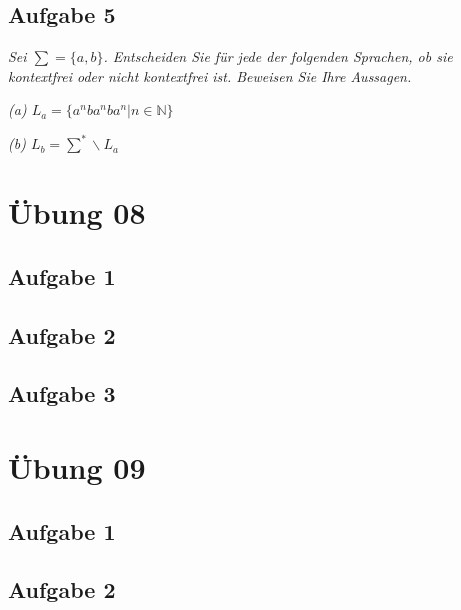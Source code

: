 \documentclass[a4paper]{article}
\begin{document}
\subsection{Aufgabe 5}
\textit{Sei $\sum = \{a, b\}$. Entscheiden Sie für jede der folgenden Sprachen, ob sie kontextfrei oder nicht kontextfrei ist. Beweisen Sie Ihre Aussagen.}

\textit{(a) $L_a = \{a^n ba^n ba^n | n\in\mathbb{N}\}$}

\textit{(b) $L_b = \sum^*\backslash L_a$ }


\newpage
\section{Übung 08}
\subsection{Aufgabe 1}
\textit{}

\subsection{Aufgabe 2}
\textit{}


\subsection{Aufgabe 3}
\textit{}




\newpage
\section{Übung 09}
\subsection{Aufgabe 1}
\textit{}

\subsection{Aufgabe 2}
\textit{}
\end{document}
